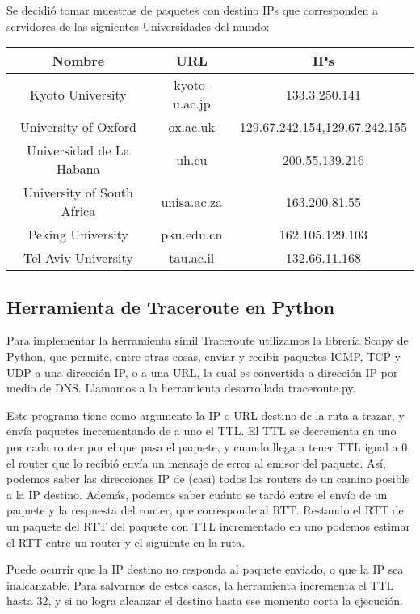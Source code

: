 Se decidió tomar muestras de paquetes con destino IPs que corresponden a
servidores de las siguientes Universidades del mundo:

\begin{center}
    \begin{tabular}{ |c|c|c| }
        \hline
        Nombre & URL & IPs \\ 
        \hline\hline
        Kyoto University & kyoto-u.ac.jp & 133.3.250.141 \\ 
        \hline
        University of Oxford & ox.ac.uk & 129.67.242.154,129.67.242.155 \\
        \hline
        Universidad de La Habana & uh.cu & 200.55.139.216 \\
        \hline
        University of South Africa & unisa.ac.za & 163.200.81.55 \\
        \hline
        Peking University & pku.edu.cn & 162.105.129.103 \\
        \hline
        Tel Aviv University & tau.ac.il & 132.66.11.168 \\
        \hline
    \end{tabular}
\end{center}


\subsection{Herramienta de Traceroute en Python}
Para implementar la herramienta símil Traceroute utilizamos la
librería Scapy de Python, que permite, entre otras cosas,
enviar y recibir paquetes ICMP, TCP y UDP a una dirección IP,
o a una URL, la cual es convertida a dirección IP por medio de 
DNS. Llamamos a la herramienta desarrollada traceroute.py.

Este programa tiene como argumento la IP o URL destino de la ruta
a trazar, y envía paquetes incrementando de a uno el TTL. El TTL
se decrementa en uno por cada router por el que pasa el paquete, y cuando
llega a tener TTL igual a 0, el router que lo recibió envía un mensaje de
error al emisor del paquete. Así, podemos saber las direcciones IP de (casi)
todos los routers de un camino posible a la IP destino. Además, podemos saber
cuánto se tardó entre el envío de un paquete y la respuesta del router, que 
corresponde al RTT. Restando el RTT de un paquete del RTT del paquete con TTL
incrementado en uno podemos estimar el RTT entre un router y el siguiente
en la ruta.

Puede ocurrir que la IP destino no responda al paquete enviado, o que la IP
sea inalcanzable. Para salvarnos de estos casos, la herramienta incrementa
el TTL hasta 32, y si no logra alcanzar el destino hasta ese momento corta la
ejecución.


